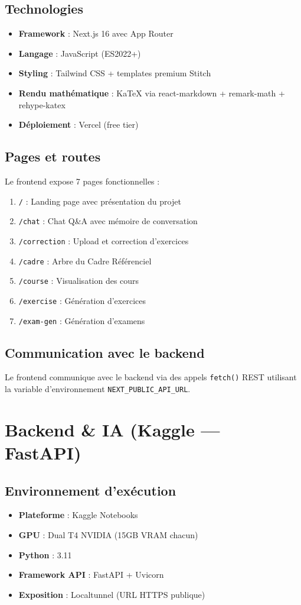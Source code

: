 \documentclass[12pt,a4paper]{report}
\begin{document}
\subsection{Technologies}
\begin{itemize}
    \item \textbf{Framework} : Next.js 16 avec App Router
    \item \textbf{Langage} : JavaScript (ES2022+)
    \item \textbf{Styling} : Tailwind CSS + templates premium Stitch
    \item \textbf{Rendu mathématique} : KaTeX via react-markdown + remark-math + rehype-katex
    \item \textbf{Déploiement} : Vercel (free tier)
\end{itemize}

\subsection{Pages et routes}
Le frontend expose 7 pages fonctionnelles :
\begin{enumerate}
    \item \texttt{/} : Landing page avec présentation du projet
    \item \texttt{/chat} : Chat Q\&A avec mémoire de conversation
    \item \texttt{/correction} : Upload et correction d'exercices
    \item \texttt{/cadre} : Arbre du Cadre Référenciel
    \item \texttt{/course} : Visualisation des cours
    \item \texttt{/exercise} : Génération d'exercices
    \item \texttt{/exam-gen} : Génération d'examens
\end{enumerate}

\subsection{Communication avec le backend}
Le frontend communique avec le backend via des appels \texttt{fetch()} REST utilisant la variable d'environnement \texttt{NEXT\_PUBLIC\_API\_URL}.

\section{Backend \& IA (Kaggle — FastAPI)}

\subsection{Environnement d'exécution}
\begin{itemize}
    \item \textbf{Plateforme} : Kaggle Notebooks
    \item \textbf{GPU} : Dual T4 NVIDIA (15GB VRAM chacun)
    \item \textbf{Python} : 3.11
    \item \textbf{Framework API} : FastAPI + Uvicorn
    \item \textbf{Exposition} : Localtunnel (URL HTTPS publique)
\end{itemize}
\end{document}
